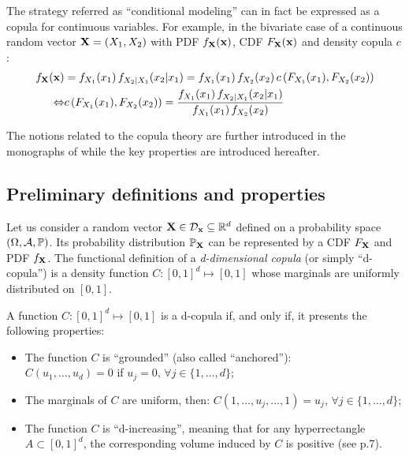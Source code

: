 \begin{remark}
    The strategy referred as ``conditional modeling'' can in fact be expressed as a copula \citep{vanem_2016} for continuous variables. For example, in the bivariate case of a continuous random vector ${\bf X} = (X_1, X_2)$ with PDF $f_{\bf X}({\bf x})$, CDF $F_{\bf X}({\bf x})$ and density copula $c$: 
    \begin{subequations}
        \begin{align}
            f_{\bf X}({\bf x}) &= f_{X_1}(x_1) \, f_{X_2|X_1}(x_2|x_1) = f_{X_1}(x_1) \, f_{X_2}(x_2) \, c\left(F_{X_1}(x_1), F_{X_2}(x_2)\right)\\
            \Leftrightarrow & c\left(F_{X_1}(x_1), F_{X_2}(x_2)\right) = \frac{f_{X_1}(x_1) \, f_{X_2|X_1}(x_2|x_1)}{f_{X_1}(x_1) \, f_{X_2}(x_2)}
        \end{align}  
    \end{subequations}
\end{remark}

The notions related to the copula theory are further introduced in the monographs of \citet{nelsen_2006_copulas,joe_2014,durante_2015_copula} while the key properties are introduced hereafter.


\subsection{Preliminary definitions and properties}\label{sec:copula_prelims}
Let us consider a random vector ${\bf X} \in \mathcal{D}_{{\bf x}}\subseteq\mathbb{R}^d$ defined on a probability space $(\Omega, \mathcal{A}, \mathbb{P})$. 
Its probability distribution $\mathbb{P}_{\bf X}$ can be represented by a CDF $F_{\bf X}$ and PDF $f_{\bf X}$. 
The functional definition of a \textit{d-dimensional copula} (or simply ``d-copula'') is a density function $C:[0, 1]^d \mapsto [0, 1]$ whose marginals are uniformly distributed on $[0, 1]$.
\begin{theorem}[Copula]
    A function $C:[0, 1]^d \mapsto [0, 1]$ is a d-copula if, and only if, it presents the following properties:
    \begin{itemize}
        \item The function $C$ is ``grounded'' (also called ``anchored''): \\$C(u_1, \dots, u_d) = 0$ if $u_j=0, \, \forall j\in\{1, \dots, d\}$;
        \item The marginals of $C$ are uniform, then: $C(1, \dots, u_j, \dots, 1) = u_j,  \, \forall j\in\{1, \dots, d\}$;
        \item The function $C$ is ``d-increasing'', meaning that for any hyperrectangle $A \subset [0, 1]^d$, the corresponding volume induced by $C$ is positive (see \cite{durante_2015_copula} p.7). 
    \end{itemize}
    \label{thm:copula}
\end{theorem}

